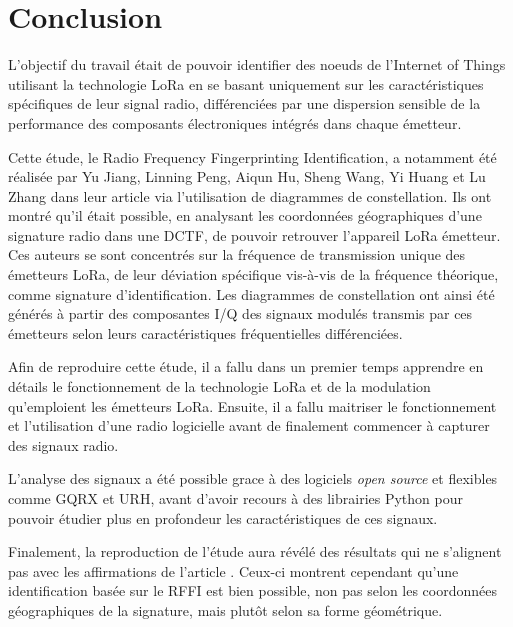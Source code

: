 \chapter*{Conclusion}
\renewcommand{\leftmark}{CONCLUSION}

L'objectif du travail était de pouvoir identifier des noeuds de l'Internet of Things utilisant la technologie \ac{LoRa} en se basant uniquement sur les caractéristiques spécifiques de leur signal radio, différenciées par une dispersion sensible de la performance des composants électroniques intégrés dans chaque émetteur.
\vspace{0.1cm}

Cette étude, le Radio Frequency Fingerprinting Identification, a notamment été réalisée par Yu Jiang, Linning Peng, Aiqun Hu, Sheng Wang, Yi Huang et Lu Zhang dans leur article \cite{loraDCTF} via l'utilisation de diagrammes de constellation. Ils ont montré qu'il était possible, en analysant les coordonnées géographiques d'une signature radio dans une \ac{DCTF}, de pouvoir retrouver l'appareil \ac{LoRa} émetteur. Ces auteurs se sont concentrés sur la fréquence de transmission unique des émetteurs \ac{LoRa}, de leur déviation spécifique vis-à-vis de la fréquence théorique, comme signature d'identification. Les diagrammes de constellation ont ainsi été générés à partir des composantes \ac{I/Q} des signaux modulés transmis par ces émetteurs selon leurs caractéristiques fréquentielles différenciées.

\vspace{0.1cm}

Afin de reproduire cette étude, il a fallu dans un premier temps apprendre en détails le fonctionnement de la technologie \ac{LoRa} et  de la modulation qu'emploient les émetteurs \ac{LoRa}. Ensuite, il a fallu maitriser le fonctionnement et l'utilisation d'une radio logicielle avant de finalement commencer à capturer des signaux radio.

\vspace{0.1cm}

L'analyse des signaux a été possible grace à des logiciels \textit{open source} et flexibles comme GQRX et \ac{URH}, avant d'avoir recours à des librairies Python pour pouvoir étudier plus en profondeur les caractéristiques de ces signaux.

\vspace{0.1cm}

Finalement, la reproduction de l'étude aura révélé des résultats qui ne s'ali\-gnent pas avec les affirmations de l'article \cite{loraDCTF}. Ceux-ci montrent cependant qu'une identification basée sur le \ac{RFFI} est bien possible, non pas selon les coordonnées géographiques de la signature, mais plutôt selon sa forme géométrique.

